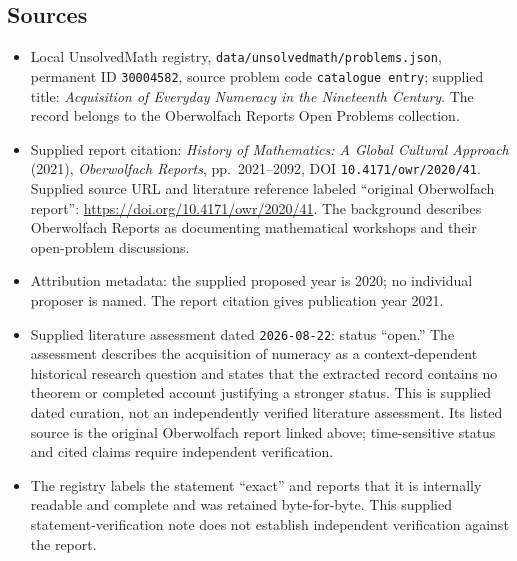 \documentclass[11pt]{article}
\begin{document}
\subsection{Sources}
\begin{itemize}
\item Local UnsolvedMath registry, \texttt{data/unsolvedmath/problems.json}, permanent ID \texttt{30004582}, source problem code \texttt{catalogue entry}; supplied title: \emph{Acquisition of Everyday Numeracy in the Nineteenth Century}. The record belongs to the Oberwolfach Reports Open Problems collection.
\item Supplied report citation: \emph{History of Mathematics: A Global Cultural Approach} (2021), \emph{Oberwolfach Reports}, pp.\ 2021--2092, DOI \texttt{10.4171/owr/2020/41}. Supplied source URL and literature reference labeled ``original Oberwolfach report'': \url{https://doi.org/10.4171/owr/2020/41}. The background describes Oberwolfach Reports as documenting mathematical workshops and their open-problem discussions.
\item Attribution metadata: the supplied proposed year is 2020; no individual proposer is named. The report citation gives publication year 2021.
\item Supplied literature assessment dated \texttt{2026-08-22}: status ``open.'' The assessment describes the acquisition of numeracy as a context-dependent historical research question and states that the extracted record contains no theorem or completed account justifying a stronger status. This is supplied dated curation, not an independently verified literature assessment. Its listed source is the original Oberwolfach report linked above; time-sensitive status and cited claims require independent verification.
\item The registry labels the statement ``exact'' and reports that it is internally readable and complete and was retained byte-for-byte. This supplied statement-verification note does not establish independent verification against the report.
\end{itemize}
\end{document}
